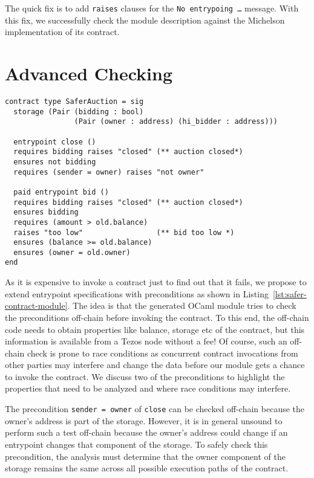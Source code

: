 \documentclass[a4paper,USenglish,american,cleveref, autoref, thm-restate]{oasics-v2021}
\begin{document}
The quick fix is to add \lstinline/raises/ clauses for the \texttt{No entrypoing \dots}
message. With this fix, we successfully check the module description against the Michelson
implementation of its contract.

\section{Advanced Checking}
\label{sec:advanced-checking}
\begin{lstlisting}[float,captionpos=b,caption={Enhanced contract module},label={lst:safer-contract-module}]
contract type SaferAuction = sig
  storage (Pair (bidding : bool) 
                (Pair (owner : address) (hi_bidder : address)))

  entrypoint close ()
  requires bidding raises "closed" (** auction closed*)
  ensures not bidding
  requires (sender = owner) raises "not owner"

  paid entrypoint bid () 
  requires bidding raises "closed" (** auction closed*)
  ensures bidding
  requires (amount > old.balance)
  raises "too low"                 (** bid too low *)
  ensures (balance >= old.balance)
  ensures (owner = old.owner)
end
\end{lstlisting}

As it is expensive to invoke a contract just to find out that it
fails, we propose to extend entrypoint specifications with
preconditions as shown in Listing~\ref{lst:safer-contract-module}. The
idea is that the generated OCaml module tries to check the
preconditions off-chain before invoking the contract. To this end, the
off-chain code needs to obtain properties like balance, storage etc of the
contract, but this information is available from a Tezos node without a fee! Of course, such an
off-chain check is prone to race conditions as concurrent contract invocations from other parties
may interfere and change the data before our module gets a chance to invoke the contract. 
We discuss two of the preconditions to highlight the properties that 
need to be analyzed and where race conditions may interfere. 

The precondition \lstinline/sender = owner/ of \lstinline/close/ can
be checked off-chain because the owner's address is part of the
storage. However, it is in general unsound to perform such a test
off-chain because the owner's address could change if an entrypoint
changes that component of the storage. To safely check this
precondition, the analysis must determine that the owner component of
the storage remains the same across all possible execution paths of
the contract.
\end{document}
